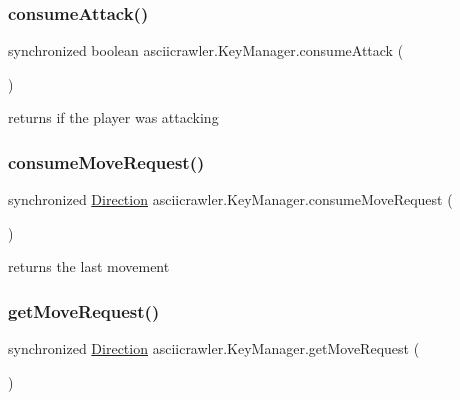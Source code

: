 \subsubsection{\texorpdfstring{consume\+Attack()}{consumeAttack()}}
{\footnotesize\ttfamily synchronized boolean asciicrawler.\+Key\+Manager.\+consume\+Attack (\begin{DoxyParamCaption}{ }\end{DoxyParamCaption})\hspace{0.3cm}{\ttfamily [inline]}}

returns if the player was attacking \mbox{\label{classasciicrawler_1_1KeyManager_aea5d8fd872321b459ca769298476f377}} 
\subsubsection{\texorpdfstring{consume\+Move\+Request()}{consumeMoveRequest()}}
{\footnotesize\ttfamily synchronized \hyperlink{enumasciicrawler_1_1Direction}{Direction} asciicrawler.\+Key\+Manager.\+consume\+Move\+Request (\begin{DoxyParamCaption}{ }\end{DoxyParamCaption})\hspace{0.3cm}{\ttfamily [inline]}}

returns the last movement \mbox{\label{classasciicrawler_1_1KeyManager_a773bb4adf1be2cbb0584529f1945bb26}} 
\subsubsection{\texorpdfstring{get\+Move\+Request()}{getMoveRequest()}}
{\footnotesize\ttfamily synchronized \hyperlink{enumasciicrawler_1_1Direction}{Direction} asciicrawler.\+Key\+Manager.\+get\+Move\+Request (\begin{DoxyParamCaption}{ }\end{DoxyParamCaption})\hspace{0.3cm}{\ttfamily [inline]}}

